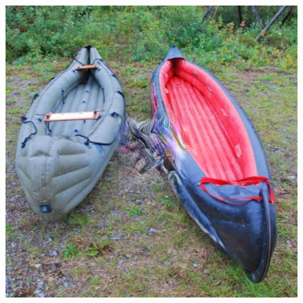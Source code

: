 \documentclass[12pt]{article}
\begin{document}
\begin{figure}[htb]
{    \includegraphics[scale=0.24]{Images/Dilated/22/bateau_out_noise_0_14.png}}
  \hfill
  \hfill
\end{figure}
\end{document}
